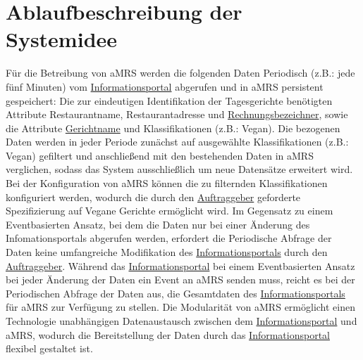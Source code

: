 \section{Ablaufbeschreibung der Systemidee}\label{cha:AblaufbeschreibungderSystemidee}
Für die Betreibung von \ac{aMRS} werden die folgenden Daten Periodisch (z.B.: jede fünf Minuten) vom \hyperref[gls:informationsportal]{Informationsportal} abgerufen und in \ac{aMRS} persistent gespeichert:
Die zur eindeutigen Identifikation der Tagesgerichte benötigten Attribute Restaurantname, Restaurantadresse und \hyperref[gls:Rechnungsbezeichner]{Rechnungsbezeichner}, sowie die Attribute \hyperref[gls:gerichtname]{Gerichtname} und Klassifikationen (z.B.: Vegan).
Die bezogenen Daten werden in jeder Periode zunächst auf ausgewählte Klassifikationen (z.B.: Vegan) gefiltert und anschließend mit den bestehenden Daten in \ac{aMRS} verglichen, sodass das System ausschließlich um neue Datensätze erweitert wird.
Bei der Konfiguration von \ac{aMRS} können die zu filternden Klassifikationen konfiguriert werden, wodurch die durch den \hyperref[gls:auftraggeber]{Auftraggeber} geforderte Spezifizierung auf Vegane Gerichte ermöglicht wird.
\newparagraph
Im Gegensatz zu einem Eventbasierten Ansatz, bei dem die Daten nur bei einer Änderung des Infomationsportals abgerufen werden, erfordert die Periodische Abfrage der Daten keine umfangreiche Modifikation des \hyperref[gls:informationsportal]{Informationsportals} durch den \hyperref[gls:auftraggeber]{Auftraggeber}.
Während das \hyperref[gls:informationsportal]{Informationsportal} bei einem Eventbasierten Ansatz bei jeder Änderung der Daten ein Event an \ac{aMRS} senden muss, reicht es bei der Periodischen Abfrage der Daten aus, die Gesamtdaten des \hyperref[gls:informationsportal]{Informationsportals} für \ac{aMRS} zur Verfügung zu stellen.
\newparagraph
Die Modularität von \ac{aMRS} ermöglicht einen Technologie unabhängigen Datenaustausch zwischen dem \hyperref[gls:informationsportal]{Informationsportal} und \ac{aMRS}, wodurch die Bereitstellung der Daten durch das \hyperref[gls:informationsportal]{Informationsportal} flexibel gestaltet ist.
